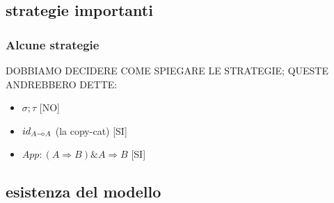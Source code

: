 \documentclass{beamer}
\newcommand{\limp}{\mathbin{{-}\mkern-3.5mu{\circ}}}
\begin{document}
\subsection{strategie importanti}

\begin{frame}

	\frametitle{Alcune strategie}
	
	DOBBIAMO DECIDERE COME SPIEGARE LE STRATEGIE; QUESTE ANDREBBERO DETTE:
	\begin{itemize}
		\item $\sigma ; \tau$ [NO]
		\item $id_{A\limp A}$ (la copy-cat) [SI]
		\item $App:(A \Rightarrow B)\& A \Rightarrow B$ [SI]
	\end{itemize}

\end{frame}


\begin{frame}[t]
	
% 	
% 		
% 		
% 		
% 		
% 				
% 				
% 		
% 		
% 		
% 		
	

	
\end{frame}

\subsection{esistenza del modello}
\end{document}
